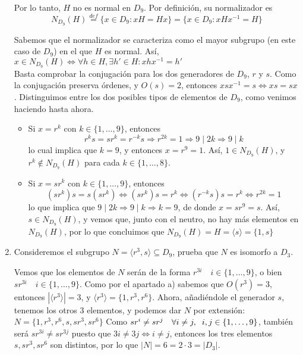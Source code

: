 \documentclass[12pt]{article}
\begin{document}
\begin{ejercicio}
\begin{enumerate}[label=(\alph*)]
            Por lo tanto, $H$ no es normal en $D_9$. Por definición, su normalizador es $$N_{D_9}(H) \stackrel{def}{=} \{x \in D_9 : xH = Hx\} = \{x \in D_9 : xHx^{-1} = H\}$$

            Sabemos que el normalizador se caracteriza como el mayor subgrupo (en este caso de $D_9$) en el que $H$ es normal. Así, $x \in N_{D_9}(H) \iff \forall h \in H, \exists h' \in H : xhx^{-1} = h'$ \\

            Basta comprobar la conjugación para los dos generadores de $D_9$, $r$ y $s$. Como la conjugación preserva órdenes, y $O(s) = 2$, entonces $xsx^{-1} = s \iff xs = sx$. Distinguimos entre los dos posibles tipos de elementos de $D_9$, como venimos haciendo hasta ahora.

            \begin{itemize}
                \item Si $x = r^k$ con $k \in \{1, \ldots, 9\}$, entonces $$r^k s = s r^k = r^{-k} s \Longrightarrow r^{2k} = 1 \Longrightarrow 9 \mid 2k \Longrightarrow 9 \mid k$$ lo cual implica que $k=9$, y entonces $x = r^9 = 1$. Así, $1 \in N_{D_9}(H)$, y $r^k \notin N_{D_9}(H)$ 
                para cada $k \in \{1, \ldots, 8\}$.
                \item Si $x = sr^k$ con $k \in \{1, \ldots, 9\}$, entonces $$(sr^k)s = s(sr^k) \iff (sr^k)s = r^k \iff (r^{-k}s)s = r^k \iff r^{2k} = 1$$
                lo que implica que $9 \mid 2k \Longrightarrow 9 \mid k \Longrightarrow k=9$, de donde $x = sr^9 = s$. Así, $s \in N_{D_9}(H)$, y vemos que, junto con el neutro, no hay más elementos en $N_{D_9}(H)$, por lo que concluimos que $N_{D_9}(H) = H = \langle s \rangle = \{1,s\}$
             \end{itemize}

            \item Consideremos el subgrupo $N = \langle r^3, s \rangle \subseteq D_9$, prueba que $N$ es isomorfo a $D_3$.
            
            Vemos que los elementos de $N$ serán de la forma $r^{3i} \quad i \in \{1, \ldots, 9\}$, o bien $sr^{3i} \quad i \in \{1, \ldots, 9\}$. Como por el apartado a) sabemos que $O(r^3) = 3$, entonces $|\langle r^3 \rangle| = 3$, y $\langle r^3 \rangle = \{1, r^3, r^6\}$. Ahora, añadiéndole
            el generador $s$, tenemos los otros $3$ elementos, y podemos dar $N$ por extensión: $N = \{1, r^3, r^6, s, sr^3, sr^6\}$ Como $sr^{i} \neq sr^j \quad \forall i\neq j, \hspace{0.2cm} i,j \in \{1, \ldots, 9\}$, también será $sr^{3i} \neq sr^{3j}$ puesto que $3i \neq 3j \iff i \neq j$, 
            entonces los tres elementos $s, sr^3, sr^6$ son distintos, por lo que $|N| = 6 = 2 \cdot 3 = |D_3|$. \\


\end{enumerate}
\end{ejercicio}
\end{document}
